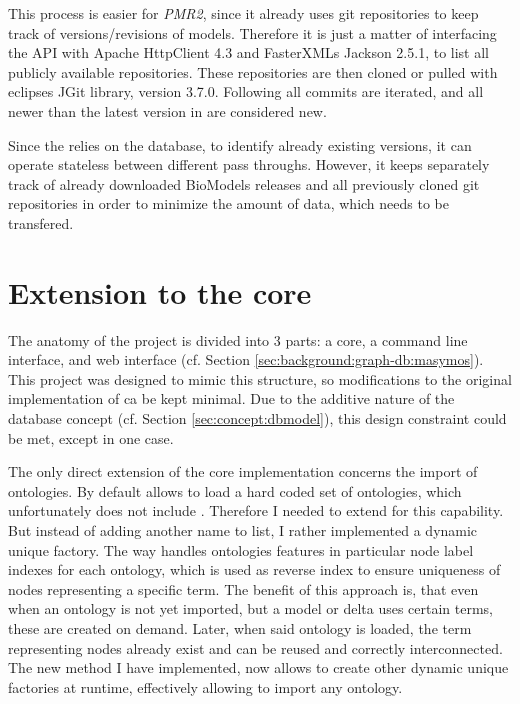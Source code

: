 	This process is easier for \emph{PMR2}, since it already uses git repositories to keep track of versions/revisions of models. Therefore it is just a matter of interfacing the \rest API with Apache HttpClient 4.3 and FasterXMLs Jackson 2.5.1, to list all publicly available repositories. These repositories are then cloned or pulled with eclipses JGit library, version 3.7.0. Following all commits are iterated, and all newer than the latest version in \masymos are considered new.

	Since the \modelcrawler relies on the \masymos database, to identify already existing versions, it can operate stateless between different pass throughs. However, it keeps separately track of already downloaded BioModels releases and all previously cloned git repositories in order to minimize the amount of data, which needs to be transfered.

\section{Extension to the \masymos core}
	\label{sec:impl:masymos}
	The anatomy of the \masymos project is divided into 3 parts: a core, a command line interface, and web \rest interface (cf. Section \ref{sec:background:graph-db:masymos}). This project was designed to mimic this structure, so modifications to the original implementation of \masymos ca be kept minimal. Due to the additive nature of the database concept (cf. Section \ref{sec:concept:dbmodel}), this design constraint could be met, except in one case.
	
	The only direct extension of the core implementation concerns the import of ontologies. By default \masymos allows to load a hard coded set of ontologies, which unfortunately does not include \comodi. Therefore I needed to extend \masymos for this capability. But instead of adding another name to list, I rather implemented a dynamic unique factory. The way \masymos handles ontologies features in particular node label indexes for each ontology, which is used as reverse index to ensure uniqueness of nodes representing a specific term.
	The benefit of this approach is, that even when an ontology is not yet imported, but a model or delta uses certain terms, these are created on demand. Later, when said ontology is loaded, the term representing nodes already exist and can be reused and correctly interconnected.
	The new method I have implemented, now allows to create other dynamic unique factories at runtime, effectively allowing to import any ontology.

